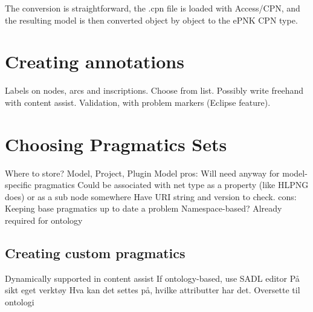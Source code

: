 The conversion is straightforward, the .cpn file is loaded with Access/CPN,
and the resulting model is then converted object by object to the ePNK CPN type.

\section{Creating annotations}
Labels on nodes, arcs and inscriptions. 
Choose from list. Possibly write freehand with content assist. Validation, with
problem markers (Eclipse feature).

\section{Choosing Pragmatics Sets}
Where to store? Model, Project, Plugin
Model pros:
	Will need anyway for model-specific pragmatics
	Could be associated with net type as a property (like HLPNG does) or as a sub
	node somewhere
	Have URI string and version to check.
cons:
	Keeping base pragmatics up to date a problem
Namespace-based? Already required for ontology


	\subsection{Creating custom pragmatics}
	Dynamically supported in content assist 
	If ontology-based, use SADL editor
	På sikt eget verktøy
		Hva kan det settes på, hvilke attributter har det.
		Oversette til ontologi

